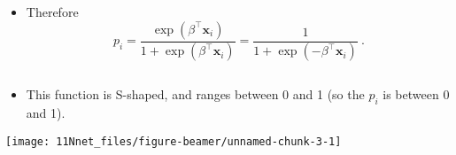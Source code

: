 \documentclass[10pt,ignorenonframetext,]{beamer}
\providecommand{\tightlist}{%
  \setlength{\itemsep}{0pt}\setlength{\parskip}{0pt}}
\begin{document}
\begin{frame}

\begin{itemize}
\tightlist
\item
  Therefore \[
  p_i = \frac{\exp(\beta^\top {\boldsymbol x}_i)}{1+\exp(\beta^\top {\boldsymbol x}_i)} = \frac{1}{1+\exp(-\beta^\top {\boldsymbol x}_i)} \ .
  \]
\end{itemize}

\(~\)

\begin{itemize}
\tightlist
\item
  This function is S-shaped, and ranges between 0 and 1 (so the \(p_i\)
  is between 0 and 1).
\end{itemize}

\begin{center}\texttt{[image: 11Nnet\_files/figure-beamer/unnamed-chunk-3-1]} \end{center}

\end{frame}
\end{document}
